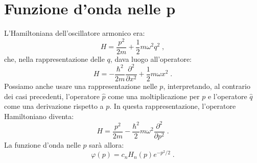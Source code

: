 \documentclass[12pt,a4paper]{report}
\theoremstyle{definition}
\numberwithin{equation}{section}
\begin{document}
\section{Funzione d'onda nelle p}
L'Hamiltoniana dell'oscillatore armonico era:
\begin{equation}
H=\frac{p^2}{2m}+\frac{1}{2}m\omega^2q^2\;,
\end{equation}
che, nella rappresentazione delle $q$, dava luogo all'operatore:
$$
H=-\frac{\hbar^2}{2m}\frac{\partial^2}{\partial x^2}+\frac{1}{2}m\omega x^2\;.
$$
Possiamo anche usare una rappresentazione nelle $p$, interpretando, al contrario dei casi precedenti, l'operatore $\hat{p}$ come una moltiplicazione per $p$ e l'operatore $\hat{q}$ come una derivazione rispetto a $p$. In questa rappresentazione, l'operatore Hamiltoniano diventa:
\begin{equation}
H=\frac{p^2}{2m}-\frac{\hbar^2}{2}m\omega^2\frac{\partial^2}{\partial p^2}\;.
\end{equation}
La funzione d'onda nelle $p$ sarà allora:
\begin{equation}
\varphi(p)=c_nH_n(p)e^{-p^2/2}\;.
\end{equation}
\end{document}
